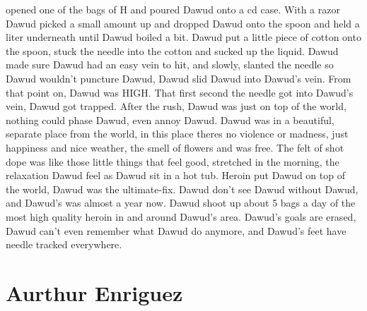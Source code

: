 \documentclass[12pt]{book}
\begin{document}
opened one of the bags of H and poured Dawud onto a cd case. With a razor Dawud picked a small amount up and dropped Dawud onto the spoon and held a liter underneath until Dawud boiled a bit. Dawud put a little piece of cotton onto the spoon, stuck the needle into the cotton and sucked up the liquid. Dawud made sure Dawud had an easy vein to hit, and slowly, slanted the needle so Dawud wouldn't puncture Dawud, Dawud slid Dawud into Dawud's vein. From that point on, Dawud was HIGH. That first second the needle got into Dawud's vein, Dawud got trapped. After the rush, Dawud was just on top of the world, nothing could phase Dawud, even annoy Dawud. Dawud was in a beautiful, separate place from the world, in this place theres no violence or madness, just happiness and nice weather, the smell of flowers and was free. The felt of shot dope was like those little things that feel good, stretched in the morning, the relaxation Dawud feel as Dawud sit in a hot tub. Heroin put Dawud on top of the world, Dawud was the ultimate-fix. Dawud don't see Dawud without Dawud, and Dawud's was almost a year now. Dawud shoot up about 5 bags a day of the most high quality heroin in and around Dawud's area. Dawud's goals are erased, Dawud can't even remember what Dawud do anymore, and Dawud's feet have needle tracked everywhere.



\chapter{Aurthur Enriguez}
\end{document}
